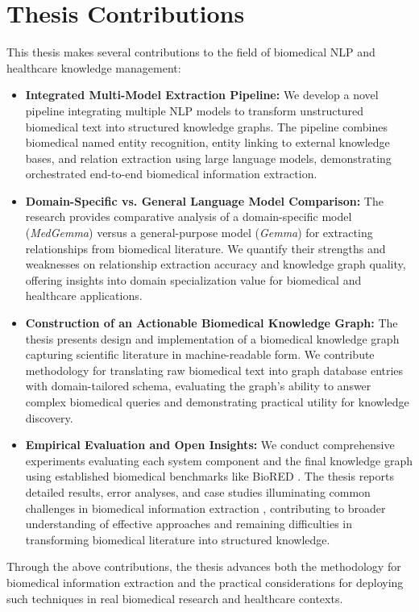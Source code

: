 
\section{Thesis Contributions}

This thesis makes several contributions to the field of biomedical NLP and healthcare knowledge management:

\begin{itemize}
  \item \textbf{Integrated Multi-Model Extraction Pipeline:} We develop a novel pipeline integrating multiple NLP models to transform unstructured biomedical text into structured knowledge graphs. The pipeline combines biomedical named entity recognition, entity linking to external knowledge bases, and relation extraction using large language models, demonstrating orchestrated end-to-end biomedical information extraction.

  \item \textbf{Domain-Specific vs. General Language Model Comparison:} The research provides comparative analysis of a domain-specific model (\emph{MedGemma}) versus a general-purpose model (\emph{Gemma}) for extracting relationships from biomedical literature. We quantify their strengths and weaknesses on relationship extraction accuracy and knowledge graph quality, offering insights into domain specialization value for biomedical and healthcare applications.

  \item \textbf{Construction of an Actionable Biomedical Knowledge Graph:} The thesis presents design and implementation of a biomedical knowledge graph capturing scientific literature in machine-readable form. We contribute methodology for translating raw biomedical text into graph database entries with domain-tailored schema, evaluating the graph's ability to answer complex biomedical queries and demonstrating practical utility for knowledge discovery.

  \item \textbf{Empirical Evaluation and Open Insights:} We conduct comprehensive experiments evaluating each system component and the final knowledge graph using established biomedical benchmarks like BioRED \parencite{BioRED}. The thesis reports detailed results, error analyses, and case studies illuminating common challenges in biomedical information extraction \parencite{Hier2025}, contributing to broader understanding of effective approaches and remaining difficulties in transforming biomedical literature into structured knowledge.
\end{itemize}

Through the above contributions, the thesis advances both the methodology for biomedical information extraction and the practical considerations for deploying such techniques in real biomedical research and healthcare contexts.